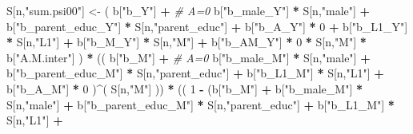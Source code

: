 \documentclass[
]{book}
\newenvironment{Shaded}{\begin{snugshade}}{\end{snugshade}}
\newcommand{\CommentTok}[1]{\textcolor[rgb]{0.56,0.35,0.01}{\textit{#1}}}
\newcommand{\DecValTok}[1]{\textcolor[rgb]{0.00,0.00,0.81}{#1}}
\newcommand{\NormalTok}[1]{#1}
\newcommand{\OtherTok}[1]{\textcolor[rgb]{0.56,0.35,0.01}{#1}}
\newcommand{\SpecialCharTok}[1]{\textcolor[rgb]{0.81,0.36,0.00}{\textbf{#1}}}
\newcommand{\StringTok}[1]{\textcolor[rgb]{0.31,0.60,0.02}{#1}}
\begin{document}
\begin{Shaded}
\begin{Highlighting}[]
\NormalTok{    S[n,}\StringTok{"sum.psi00"}\NormalTok{] }\OtherTok{\textless{}{-}}\NormalTok{  ( b[}\StringTok{"b\_Y"}\NormalTok{] }\SpecialCharTok{+}                                           \CommentTok{\# A=0}
\NormalTok{                             b[}\StringTok{"b\_male\_Y"}\NormalTok{] }\SpecialCharTok{*}\NormalTok{ S[n,}\StringTok{"male"}\NormalTok{] }\SpecialCharTok{+} 
\NormalTok{                             b[}\StringTok{"b\_parent\_educ\_Y"}\NormalTok{] }\SpecialCharTok{*}\NormalTok{ S[n,}\StringTok{"parent\_educ"}\NormalTok{] }\SpecialCharTok{+} 
\NormalTok{                             b[}\StringTok{"b\_A\_Y"}\NormalTok{] }\SpecialCharTok{*} \DecValTok{0} \SpecialCharTok{+} 
\NormalTok{                             b[}\StringTok{"b\_L1\_Y"}\NormalTok{] }\SpecialCharTok{*}\NormalTok{ S[n,}\StringTok{"L1"}\NormalTok{] }\SpecialCharTok{+}
\NormalTok{                             b[}\StringTok{"b\_M\_Y"}\NormalTok{] }\SpecialCharTok{*}\NormalTok{ S[n,}\StringTok{"M"}\NormalTok{] }\SpecialCharTok{+}
\NormalTok{                             b[}\StringTok{"b\_AM\_Y"}\NormalTok{] }\SpecialCharTok{*} \DecValTok{0} \SpecialCharTok{*}\NormalTok{ S[n,}\StringTok{"M"}\NormalTok{] }\SpecialCharTok{*}\NormalTok{ b[}\StringTok{"A.M.inter"}\NormalTok{] ) }\SpecialCharTok{*}
\NormalTok{      (( b[}\StringTok{"b\_M"}\NormalTok{] }\SpecialCharTok{+}                                                             \CommentTok{\# A\textquotesingle{}=0}
\NormalTok{           b[}\StringTok{"b\_male\_M"}\NormalTok{] }\SpecialCharTok{*}\NormalTok{ S[n,}\StringTok{"male"}\NormalTok{] }\SpecialCharTok{+} 
\NormalTok{           b[}\StringTok{"b\_parent\_educ\_M"}\NormalTok{] }\SpecialCharTok{*}\NormalTok{ S[n,}\StringTok{"parent\_educ"}\NormalTok{] }\SpecialCharTok{+} 
\NormalTok{           b[}\StringTok{"b\_L1\_M"}\NormalTok{] }\SpecialCharTok{*}\NormalTok{ S[n,}\StringTok{"L1"}\NormalTok{] }\SpecialCharTok{+}
\NormalTok{           b[}\StringTok{"b\_A\_M"}\NormalTok{] }\SpecialCharTok{*} \DecValTok{0}\NormalTok{ )}\SpecialCharTok{\^{}}\NormalTok{( S[n,}\StringTok{"M"}\NormalTok{] )) }\SpecialCharTok{*}
\NormalTok{      (( }\DecValTok{1} \SpecialCharTok{{-}}\NormalTok{ (b[}\StringTok{"b\_M"}\NormalTok{] }\SpecialCharTok{+} 
\NormalTok{                b[}\StringTok{"b\_male\_M"}\NormalTok{] }\SpecialCharTok{*}\NormalTok{ S[n,}\StringTok{"male"}\NormalTok{] }\SpecialCharTok{+} 
\NormalTok{                b[}\StringTok{"b\_parent\_educ\_M"}\NormalTok{] }\SpecialCharTok{*}\NormalTok{ S[n,}\StringTok{"parent\_educ"}\NormalTok{] }\SpecialCharTok{+} 
\NormalTok{                b[}\StringTok{"b\_L1\_M"}\NormalTok{] }\SpecialCharTok{*}\NormalTok{ S[n,}\StringTok{"L1"}\NormalTok{] }\SpecialCharTok{+}

\end{Highlighting}
\end{Shaded}
\end{document}
